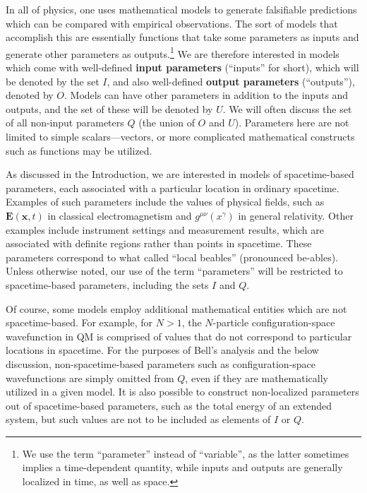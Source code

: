 \documentclass[rmp, aps, preprint, longbibliography]{revtex4-1}
\begin{document}
In all of physics, one uses mathematical models to generate falsifiable predictions which can be compared with empirical observations.  The sort of models that accomplish this are essentially functions that take some parameters as inputs and generate other parameters as outputs.\footnote{We use the term ``parameter'' instead of ``variable'', as the latter sometimes implies a time-dependent quantity, while inputs and outputs are generally localized in time, as well as space.}
We are therefore interested in models which come with well-defined {\bf input parameters} (``inputs'' for short), which will be denoted by the set $I$, and also well-defined {\bf output parameters} (``outputs''), denoted by $O$.  Models can have other parameters in addition to the inputs and outputs, and the set of these will be denoted by $U$.  We will often discuss the set of all non-input parameters $Q$ (the union of $O$ and $U$).  Parameters here are not limited to simple scalars---vectors, or more complicated mathematical constructs such as functions may be utilized.

As discussed in the Introduction, we are interested in models of spacetime-based parameters, each associated with a particular location in ordinary spacetime.  Examples of such parameters include the values of physical fields, such as $\bm{E}(\bm{x},t)$ in classical electromagnetism and $g^{\mu\nu}(x^\gamma)$ in general relativity.  Other examples include instrument settings and measurement results, which are associated with definite regions rather than points in spacetime.  These parameters correspond to what \textcite{bell1976b} called ``local beables'' (pronounced be-ables).  Unless otherwise noted, our use of the term ``parameters'' will be restricted to spacetime-based parameters, including the sets $I$ and $Q$.

Of course, some models employ additional mathematical entities which are not spacetime-based.  For example, for $N>1$, the $N$-particle configuration-space wavefunction in QM is comprised of values that do not correspond to particular locations in spacetime.  For the purposes of Bell's analysis and the below discussion, non-spacetime-based parameters such as configuration-space wavefunctions are simply omitted from $Q$, even if they are mathematically utilized in a given model.  It is also possible to construct non-localized parameters out of spacetime-based parameters, such as the total energy of an extended system, but such values are not to be included as elements of $I$ or $Q$.
\end{document}
